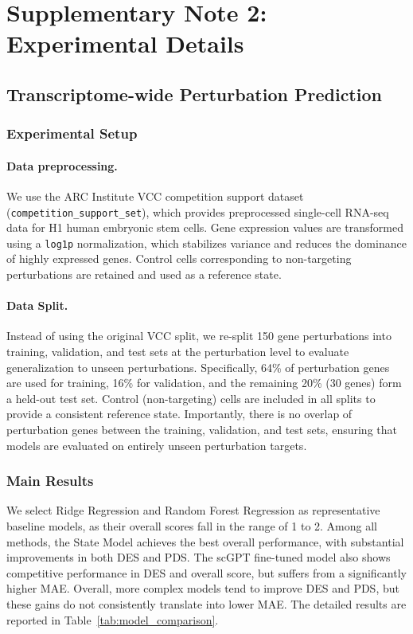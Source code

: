 \documentclass{article}
\begin{document}
\section{Supplementary Note 2: Experimental Details}

\subsection{Transcriptome-wide Perturbation Prediction}

\subsubsection{Experimental Setup}

\paragraph{Data preprocessing.}
We use the ARC Institute VCC competition support dataset (\texttt{competition\_support\_set}),
which provides preprocessed single-cell RNA-seq data for H1 human embryonic stem cells.
Gene expression values are transformed using a \texttt{log1p} normalization,
which stabilizes variance and reduces the dominance of highly expressed genes.
Control cells corresponding to non-targeting perturbations are retained and used as a reference state.

\paragraph{Data Split.}

Instead of using the original VCC split, we re-split 150 gene perturbations into training, validation, and test sets at the perturbation level to evaluate generalization to unseen perturbations.
Specifically, 64\% of perturbation genes are used for training, 16\% for validation, and the remaining 20\% (30 genes) form a held-out test set.
Control (non-targeting) cells are included in all splits to provide a consistent reference state.
Importantly, there is no overlap of perturbation genes between the training, validation, and test sets, ensuring that models are evaluated on entirely unseen perturbation targets.

\subsubsection{Main Results}
    
We select Ridge Regression and Random Forest Regression as representative baseline models, as their overall scores fall in the range of 1  to 2. Among all methods, the State Model achieves the best overall performance, with substantial improvements in both DES and PDS. The scGPT fine-tuned model also shows competitive performance in DES and overall score, but suffers from a significantly higher MAE. Overall, more complex models tend to improve DES and PDS, but these gains do not consistently translate into lower MAE. The detailed results are reported in Table~\ref{tab:model_comparison}.
\end{document}
